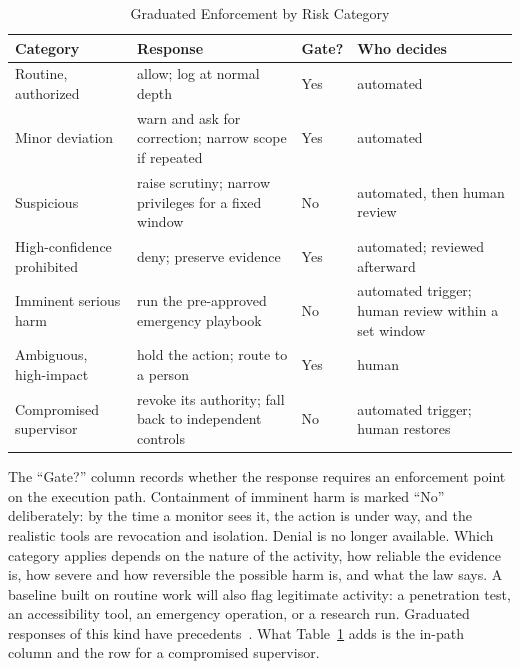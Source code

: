 \documentclass[journal]{IEEEtran}
\begin{document}
\begin{table}[!t]
\caption{Graduated Enforcement by Risk Category}
\label{tab:enforcement}
\centering
\footnotesize
\setlength{\tabcolsep}{3pt}
\begin{tabular}{>{\raggedright\arraybackslash}p{1.75cm}>{\raggedright\arraybackslash}p{2.3cm}>{\raggedright\arraybackslash}p{0.8cm}>{\raggedright\arraybackslash}p{2.05cm}}
\toprule
\rowcolor{darkblue!15}
\textbf{Category} & \textbf{Response} & \textbf{Gate?} & \textbf{Who decides} \\
\midrule
Routine, authorized & allow; log at normal depth & Yes & automated \\
\rowcolor{darkblue!5}
Minor deviation & warn and ask for correction; narrow scope if repeated & Yes & automated \\
Suspicious & raise scrutiny; narrow privileges for a fixed window & No & automated, then human review \\
\rowcolor{darkblue!5}
High-confidence prohibited & deny; preserve evidence & Yes & automated; reviewed afterward \\
Imminent serious harm & run the pre-approved emergency playbook & No & automated trigger; human review within a set window \\
\rowcolor{darkblue!5}
Ambiguous, high-impact & hold the action; route to a person & Yes & human \\
Compromised supervisor & revoke its authority; fall back to independent controls & No & automated trigger; human restores \\
\bottomrule
\end{tabular}
\end{table}

The ``Gate?'' column records whether the response requires an enforcement point on the execution path. Containment of imminent harm is marked ``No'' deliberately: by the time a monitor sees it, the action is under way, and the realistic tools are revocation and isolation. Denial is no longer available. Which category applies depends on the nature of the activity, how reliable the evidence is, how severe and how reversible the possible harm is, and what the law says. A baseline built on routine work will also flag legitimate activity: a penetration test, an accessibility tool, an emergency operation, or a research run. Graduated responses of this kind have precedents~\cite{gaurav2025gaas,wang2025mi9}.
What Table~\ref{tab:enforcement} adds is the in-path column and the row for a compromised supervisor.
\end{document}
